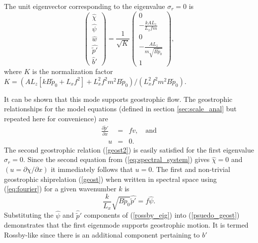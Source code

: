 \documentclass[times]{qjrms4}
\begin{document}
The unit eigenvector corresponding to the eigenvalue $ \sigma_r = 0$ is 
 \begin{equation} \label{rossby_eig}
   \left ( 
     \begin{array}{c} 
       \widehat \chi \\ \widehat \psi \\ \widehat w \\ \widehat {\tilde{p}'} \\ \widehat b' 
     \end{array} 
   \right) 
   = \frac 1{\sqrt{K}}
      \left ( 
       \begin{array}{c} 
         0 \\ -\frac{kAL_z}{L_xfm} \\ 0 \\ -\frac{AL_z}{ m \sqrt{B\tilde{p}_0}} \\ 1 
       \end{array} 
      \right),
 \end{equation} 
where $K$ is the normalization factor $K = (A L_z[k B\tilde{p}_0 + L_x f^2] + L_x^2 f^2 m^2 B\tilde{p}_0)/(L_x^2 f^2 m^2 B\tilde{p}_0)$.

It can be shown that this mode supports geostrophic flow. 
The geostrophic relationships for the model equations (defined in section \ref{sec:scale_anal} 
but repeated here for convenience) are
  \begin{eqnarray}
    \frac {\partial \tilde{p}' }{\partial x} &=& f v, \label{geost} \quad \mbox{and} \\
    \quad u &=& 0. \label{geost2}
  \end{eqnarray}
The second geostrophic relation  (\ref{geost2}) is easily satisfied for the first 
eigenvalue $\sigma_r =0$.  Since the second equation from (\ref{eq:spectral_system}) gives 
$\widehat \chi = 0$  and $ \left (u = {\partial \chi}/{\partial x} \right )$ it immediately 
follows that $u = 0$.   
The first and non-trivial geostrophic shiprelation (\ref{geost}) when
written in spectral space using (\ref{eq:fourier}) for a given wavenumber $k$ is 
   \begin{equation}  \label{psuedo_geost} 
      \frac{k}{L_x} \sqrt{B\tilde{p}_0} \widehat {\tilde{p}'} = f \widehat \psi.
   \end{equation}
%
Substituting the $\widehat{\psi}$ and $\widehat{\tilde p}'$ components of (\ref{rossby_eig}) into 
(\ref{psuedo_geost}) demonstrates that the first eigenmode supports geostrophic motion. 
It is termed Rossby-like since there is an additional component pertaining to $b'$
\end{document}
